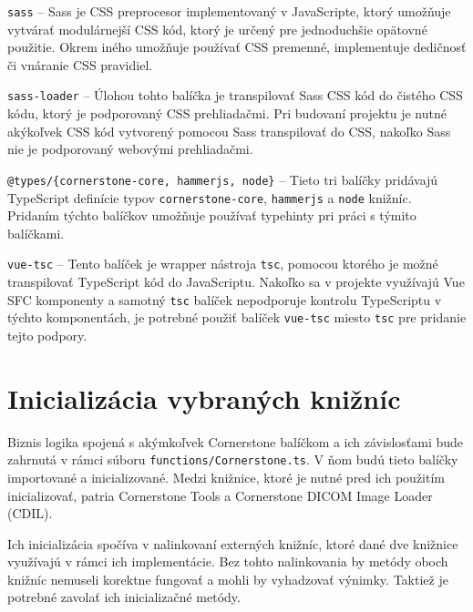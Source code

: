 \texttt{sass} -- Sass je CSS preprocesor implementovaný v JavaScripte, ktorý umožňuje vytvárať modulárnejší CSS kód, ktorý je určený pre jednoduchšie opätovné použitie. Okrem iného umožňuje používať CSS premenné, implementuje dedičnosť či vnáranie CSS pravidiel.

\texttt{sass-loader} -- Úlohou tohto balíčka je transpilovať Sass CSS kód do čistého CSS kódu, ktorý je podporovaný CSS prehliadačmi. Pri budovaní projektu je nutné akýkoľvek CSS kód vytvorený pomocou Sass transpilovať do CSS, nakoľko Sass nie je podporovaný webovými prehliadačmi.

\texttt{@types/\{cornerstone-core, hammerjs, node\}} -- Tieto tri balíčky pridávajú TypeScript definície typov \texttt{cornerstone-core}, \texttt{hammerjs} a \texttt{node} knižníc. Pridaním týchto balíčkov umožňuje používať typehinty pri práci s týmito balíčkami.

\texttt{vue-tsc} -- Tento balíček je wrapper nástroja \texttt{tsc}, pomocou ktorého je možné transpilovať TypeScript kód do JavaScriptu. Nakoľko sa v projekte využívajú Vue SFC komponenty a samotný \texttt{tsc} balíček nepodporuje kontrolu TypeScriptu v týchto komponentách, je potrebné použiť balíček \texttt{vue-tsc} miesto \texttt{tsc} pre pridanie tejto podpory. 

\section {Inicializácia vybraných knižníc}
Biznis logika spojená s akýmkoľvek Cornerstone balíčkom a ich závislosťami bude zahrnutá v rámci súboru \texttt{functions/Cornerstone.ts}. V ňom budú tieto balíčky importované a inicializované. Medzi knižnice, ktoré je nutné pred ich použitím inicializovať, patria Cornerstone Tools a Cornerstone DICOM Image Loader (CDIL).

Ich inicializácia spočíva v nalinkovaní externých knižníc, ktoré dané dve knižnice využívajú v rámci ich implementácie. Bez tohto nalinkovania by metódy oboch knižníc nemuseli korektne fungovať a mohli by vyhadzovať výnimky. Taktiež je potrebné zavolať ich inicializačné metódy.


